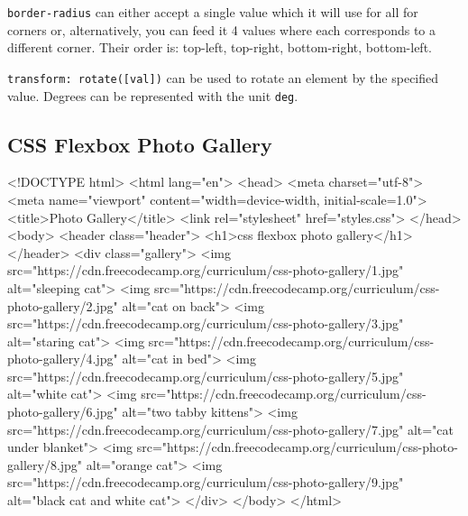 \texttt{border-radius} can either accept a single value which it will use for all for corners or, alternatively, you can feed it 4 values where each corresponds to a different corner. Their order is: top-left, top-right, bottom-right, bottom-left.

\texttt{transform: rotate([val])} can be used to rotate an element by the specified value. Degrees can be represented with the unit \texttt{deg}.


\subsection{CSS Flexbox Photo Gallery}
\begin{html}
<!DOCTYPE html>
<html lang="en">
  <head>
    <meta charset="utf-8">
    <meta name="viewport" content="width=device-width, initial-scale=1.0">
    <title>Photo Gallery</title>
    <link rel="stylesheet" href="styles.css">
  </head>
  <body>
    <header class="header">
      <h1>css flexbox photo gallery</h1>
    </header>
    <div class="gallery">
      <img src="https://cdn.freecodecamp.org/curriculum/css-photo-gallery/1.jpg" alt="sleeping cat">
      <img src="https://cdn.freecodecamp.org/curriculum/css-photo-gallery/2.jpg" alt="cat on back">
      <img src="https://cdn.freecodecamp.org/curriculum/css-photo-gallery/3.jpg" alt="staring cat">
      <img src="https://cdn.freecodecamp.org/curriculum/css-photo-gallery/4.jpg" alt="cat in bed">
      <img src="https://cdn.freecodecamp.org/curriculum/css-photo-gallery/5.jpg" alt="white cat">
      <img src="https://cdn.freecodecamp.org/curriculum/css-photo-gallery/6.jpg" alt="two tabby kittens">
      <img src="https://cdn.freecodecamp.org/curriculum/css-photo-gallery/7.jpg" alt="cat under blanket">
      <img src="https://cdn.freecodecamp.org/curriculum/css-photo-gallery/8.jpg" alt="orange cat">
      <img src="https://cdn.freecodecamp.org/curriculum/css-photo-gallery/9.jpg" alt="black cat and white cat">
    </div>
  </body>
</html>
\end{html}

